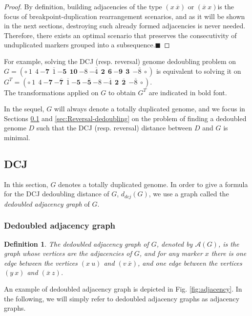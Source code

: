 \documentclass[11pt,final,twoside,nofrench]{thlifl}
\newcommand{\qed}{\ensuremath{\blacksquare}}
\newcommand{\fst}[1]{ \ensuremath{#1} }
\newcommand{\snd}[1]{ \ensuremath{\overline{#1}} }
\newcommand{\msnd}[1]{ \ensuremath{{-\overline{#1}}} }
\newcommand\aff[2]{\ensuremath{(\fst{#1}~\fst{#2})}}
\newcommand\asf[2]{\ensuremath{(\snd{#1}~\fst{#2})}}
\newcommand\afs[2]{\ensuremath{(\fst{#1}~\snd{#2})}}
\newtheorem{proof}{Proof}
\newtheorem{definition}{Definition}
\begin{document}
\begin{proof}
By definition, building adjacencies of the type $\afs{x}{x}$ or $\asf{x}{x}$is the focus of breakpoint-duplication rearrangement scenarios, and as it will be shown in the next sections, destroying such already formed adjacencies is never needed. Therefore, there exists an optimal scenario that preserves the consecutivity of unduplicated markers grouped into a subsequence.\qed
\end{proof}

For example, solving the DCJ (resp. reversal) genome dedoubling problem on
 $G = (\circ ~ 1~~4~\mathbf{-7}~~\snd{1}~\mathbf{{-5} ~~10}~{-8}~ \msnd{4}~~\mathbf{2~~6~{-9} ~~3}~~\msnd{8}~ {\circ})$ 
is equivalent to solving it on
 $G^T = (\circ ~ 1~~4~\mathbf{{-7}~\msnd{7}}~~\snd{1}~\mathbf{{-5}~\msnd{5}}~{-8}~ \msnd{4}~~\mathbf{2~~\snd{2}}~~\msnd{8}~ {\circ})$.\\
The transformations applied on $G$ to obtain $G^T$ are indicated in bold font.

In the sequel, $G$ will always denote a totally duplicated genome, and 
we focus in Sections \ref{sec:DCJ-dedoubling} and \ref{sec:Reversal-dedoubling}  on the problem of finding  a dedoubled genome $D$ such that the DCJ  (resp. reversal) distance between  $D$ and $G$ is minimal.

\subsection{DCJ}
\label{sec:DCJ-dedoubling}

In this section, $G$ denotes a totally duplicated genome. In order to give
a formula for the DCJ dedoubling distance of $G$, $d_{dcj}(G)$, we use a 
graph called the  \emph{dedoubled adjacency graph} of $G$.

\subsubsection{Dedoubled adjacency graph}

\begin{definition}
The \emph{dedoubled adjacency graph} of $G$, denoted by $\mathcal{A}(G)$, 
is the graph whose vertices are the adjacencies of $G$, and for any marker $x$ 
there is one edge between  the vertices $\aff{x}{u}$ and  $\afs{v}{x}$, 
and  one edge between  the vertices $\aff{y}{x}$ and  $\asf{x}{z}$.
\end{definition}

An example of dedoubled adjacency  graph is depicted in 
Fig. \ref{fig:adjacency}. In the following, we will simply refer to 
dedoubled adjacency graphs as
adjacency graphs.
\end{document}
